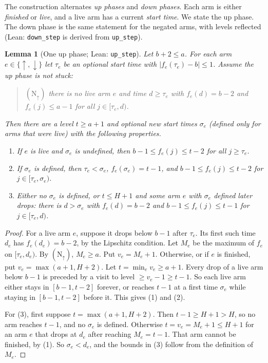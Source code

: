 \documentclass[11pt]{article}
\newtheorem{lemma}[theorem]{Lemma}
\theoremstyle{definition}
\theoremstyle{remark}
\newcommand{\lean}[1]{\texttt{#1}}
\begin{document}
The construction alternates \emph{up phases} and \emph{down phases}. Each arm
is either \emph{finished} or \emph{live}, and a live arm has a current
\emph{start time}. We state the up phase. The down phase is the same statement
for the negated arms, with levels reflected (Lean: \lean{down\_step} is
derived from \lean{up\_step}).

\begin{lemma}[One up phase; Lean: \lean{up\_step}]\label{lem:upstep}
Let $b+2\le a$. For each arm $e\in\{\uparrow,\downarrow\}$ let $\tau_e$ be an
optional start time with $|f_e(\tau_e)-b|\le1$. Assume the up phase is
\emph{not stuck}:
\begin{quote}
$(\mathrm N_\uparrow)$ there is no live arm $e$ and time $d\ge\tau_e$ with
$f_e(d)=b-2$ and $f_e(j)\le a-1$ for all $j\in[\tau_e,d)$.
\end{quote}
Then there are a level $t\ge a+1$ and optional new start times $\sigma_e$
(defined only for arms that were live) with the following properties.
\begin{enumerate}[label=(\arabic*)]
\item If $e$ is live and $\sigma_e$ is undefined, then
$b-1\le f_e(j)\le t-2$ for all $j\ge\tau_e$.
\item If $\sigma_e$ is defined, then $\tau_e<\sigma_e$, $f_e(\sigma_e)=t-1$,
and $b-1\le f_e(j)\le t-2$ for $j\in[\tau_e,\sigma_e)$.
\item Either no $\sigma_e$ is defined, or $t\le H+1$ and some arm $e$ with
$\sigma_e$ defined later drops: there is $d>\sigma_e$ with $f_e(d)=b-2$ and
$b-1\le f_e(j)\le t-1$ for $j\in[\tau_e,d)$.
\end{enumerate}
\end{lemma}
\begin{proof}
For a live arm $e$, suppose it drops below $b-1$ after $\tau_e$. Its first such
time $d_e$ has $f_e(d_e)=b-2$, by the Lipschitz condition. Let $M_e$ be the
maximum of $f_e$ on $[\tau_e,d_e)$. By $(\mathrm N_\uparrow)$, $M_e\ge a$. Put
$v_e=M_e+1$. Otherwise, or if $e$ is finished, put
$v_e=\max(a+1,H+2)$. Let $t=\min_e v_e\ge a+1$. Every drop of a live arm below
$b-1$ is preceded by a visit to level $\ge v_e-1\ge t-1$. So each live arm
either stays in $[b-1,t-2]$ forever, or reaches $t-1$ at a first time
$\sigma_e$ while staying in $[b-1,t-2]$ before it. This gives (1) and (2).

For (3), first suppose $t=\max(a+1,H+2)$. Then $t-1\ge H+1>H$, so no arm reaches
$t-1$, and no $\sigma_e$ is defined. Otherwise $t=v_e=M_e+1\le H+1$ for an arm
$e$ that drops at $d_e$ after reaching $M_e=t-1$. That arm cannot be finished,
by (1). So $\sigma_e<d_e$, and the bounds in (3) follow from the definition of
$M_e$.
\end{proof}
\end{document}
